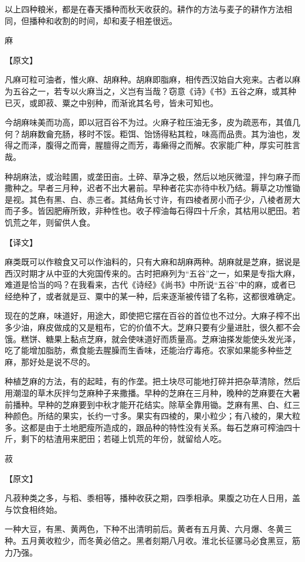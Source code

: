 \documentclass[12pt,UTF8]{ctexbook}
\begin{document}
以上四种粮米，都是在春天播种而秋天收获的。耕作的方法与麦子的耕作方法相同，但播种和收割的时间，却和麦子相差很远。

麻

【原文】

凡麻可粒可油者，惟火麻、胡麻种。胡麻即脂麻，相传西汉始自大宛来。古者以麻为五谷之一，若专以火麻当之，义岂有当哉？窃意《诗》《书》五谷之麻，或其种已灭，或即菽、粟之中别种，而渐讹其名号，皆未可知也。

今胡麻味美而功高，即以冠百谷不为过。火麻子粒压油无多，皮为疏恶布，其值几何？胡麻数龠充肠，移时不馁。粔饵、饴饧得粘其粒，味高而品贵。其为油也，发得之而泽，腹得之而膏，腥膻得之而芳，毒癞得之而解。农家能广种，厚实可胜言哉。

种胡麻法，或治畦圃，或垄田亩。土碎、草净之极，然后以地灰微湿，拌匀麻子而撒种之。早者三月种，迟者不出大暑前。早种者花实亦待中秋乃结。耨草之功惟锄是视。其色有黑、白、赤三者。其结角长寸许，有四棱者房小而子少，八棱者房大而子多。皆因肥瘠所致，非种性也。收子榨油每石得四十斤余，其枯用以肥田。若饥荒之年，则留供人食。

【译文】

麻类既可以作粮食又可以作油料的，只有大麻和胡麻两种。胡麻就是芝麻，据说是西汉时期才从中亚的大宛国传来的。古时把麻列为“五谷”之一，如果是专指大麻，难道是恰当的吗？在我看来，古代《诗经》《尚书》中所说“五谷”中的麻，或者已经绝种了，或者就是豆、粟中的某一种，后来逐渐被传错了名称，这都很难确定。

现在的芝麻，味道好，用途大，即使把它摆在百谷的首位也不过分。大麻子榨不出多少油，麻皮做成的又是粗布，它的价值不大。芝麻只要有少量进肚，很久都不会饿。糕饼、糖果上黏点芝麻，就会使味道好而质量高。芝麻油搽发能使头发光泽，吃了能增加脂肪，煮食能去腥臊而生香味，还能治疗毒疮。农家如果能多种些芝麻，那好处是说不尽的。

种植芝麻的方法，有的起畦，有的作垄。把土块尽可能地打碎并把杂草清除，然后用潮湿的草木灰拌匀芝麻种子来撒播。早种的芝麻在三月种，晚种的芝麻要在大暑前播种。早种的芝麻要到中秋才能开花结实。除草全靠用锄。芝麻有黑、白、红三种颜色。所结的果实，长约一寸多。果实有四棱的，果小粒少；有八棱的，果大粒多。这都是由于土地肥瘦所造成的，跟品种的特性没有关系。每石芝麻可榨油四十斤，剩下的枯渣用来肥田；若碰上饥荒的年份，就留给人吃。

菽

【原文】

凡菽种类之多，与稻、黍相等，播种收获之期，四季相承。果腹之功在人日用，盖与饮食相终始。

一种大豆，有黑、黄两色，下种不出清明前后。黄者有五月黄、六月爆、冬黄三种。五月黄收粒少，而冬黄必倍之。黑者刻期八月收。淮北长征骡马必食黑豆，筋力乃强。
\end{document}
